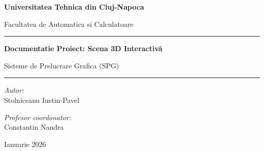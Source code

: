 \documentclass[11pt,a4paper]{article}
\begin{document}

\begin{titlepage}
    \centering
    \vspace*{2cm}
    {\Huge \textbf{Universitatea Tehnica din Cluj-Napoca}} \par
    \vspace{1cm}
    {\Large Facultatea de Automatica si Calculatoare} \par
    \vspace{3cm}
    \rule{\linewidth}{0.5mm} \par
    \vspace{0.4cm}
    {\huge \textbf{Documentatie Proiect: Scena {3D} Interactivă}} \par
    \vspace{0.4cm}
    \large Sisteme de Prelucrare Grafica (SPG) \par
    \vspace{0.4cm}
    \rule{\linewidth}{0.5mm} \par
    \vspace{4cm}
    \begin{minipage}{0.4\textwidth}
        \begin{flushleft} \large
            \emph{Autor:}\\
            Stolniceanu Iustin-Pavel
        \end{flushleft}
    \end{minipage}
    \begin{minipage}{0.4\textwidth}
        \begin{flushright} \large
            \emph{Profesor coordonator:} \\
            Constantin Nandra
        \end{flushright}
    \end{minipage}
    \vfill
    {\large Ianuarie 2026}
\end{titlepage}

\newpage
\tableofcontents
\newpage

\cleardoublepage
{}

\end{document}
